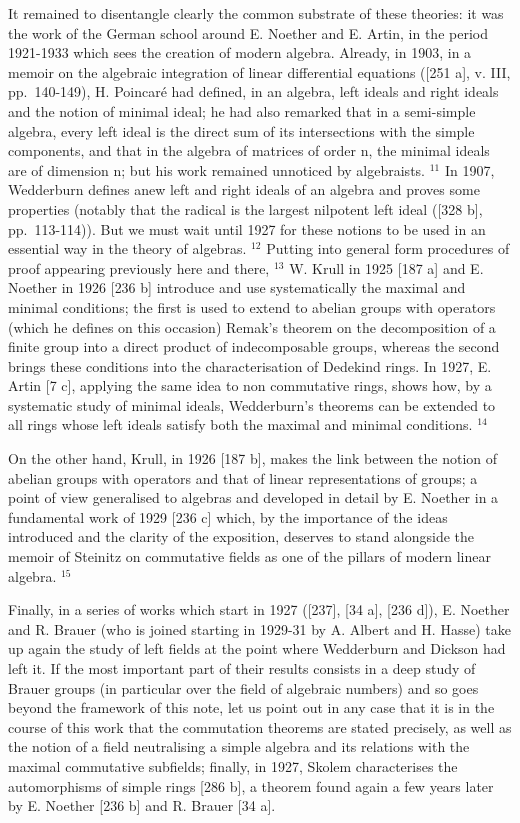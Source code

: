 It remained to disentangle clearly the common substrate of these theories: it was the work of the German school around E. Noether and E. Artin, in the period 1921-1933 which sees the creation of modern algebra. Already, in 1903, in a memoir on the algebraic integration of linear differential equations ({[}251 a{]}, v. III, pp.~140-149), H. Poincaré had defined, in an algebra, left ideals and right ideals and the notion of minimal ideal; he had also remarked that in a semi-simple algebra, every left ideal is the direct sum of its intersections with the simple components, and that in the algebra of matrices of order n, the minimal ideals are of dimension n; but his work remained unnoticed by algebraists. \(^{11}\) In 1907, Wedderburn defines anew left and right ideals of an algebra and proves some properties (notably that the radical is the largest nilpotent left ideal ({[}328 b{]}, pp.~113-114)). But we must wait until 1927 for these notions to be used in an essential way in the theory of algebras. \(^{12}\) Putting into general form procedures of proof appearing previously here and there, \(^{13}\) W. Krull in 1925 {[}187 a{]} and E. Noether in 1926 {[}236 b{]} introduce and use systematically the maximal and minimal conditions; the first is used to extend to abelian groups with operators (which he defines on this occasion) Remak's theorem on the decomposition of a finite group into a direct product of indecomposable groups, whereas the second brings these conditions into the characterisation of Dedekind rings. In 1927, E. Artin {[}7 c{]}, applying the same idea to non commutative rings, shows how, by a systematic study of minimal ideals, Wedderburn's theorems can be extended to all rings whose left ideals satisfy both the maximal and minimal conditions. \(^{14}\)

On the other hand, Krull, in 1926 {[}187 b{]}, makes the link between the notion of abelian groups with operators and that of linear representations of groups; a point of view generalised to algebras and developed in detail by E. Noether in a fundamental work of 1929 {[}236 c{]} which, by the importance of the ideas introduced and the clarity of the exposition, deserves to stand alongside the memoir of Steinitz on commutative fields as one of the pillars of modern linear algebra. \(^{15}\)

Finally, in a series of works which start in 1927 ({[}237{]}, {[}34 a{]}, {[}236 d{]}), E. Noether and R. Brauer (who is joined starting in 1929-31 by A. Albert and H. Hasse) take up again the study of left fields at the point where Wedderburn and Dickson had left it. If the most important part of their results consists in a deep study of Brauer groups (in particular over the field of algebraic numbers) and so goes beyond the framework of this note, let us point out in any case that it is in the course of this work that the commutation theorems are stated precisely, as well as the notion of a field neutralising a simple algebra and its relations with the maximal commutative subfields; finally, in 1927, Skolem characterises the automorphisms of simple rings {[}286 b{]}, a theorem found again a few years later by E. Noether {[}236 b{]} and R. Brauer {[}34 a{]}.

